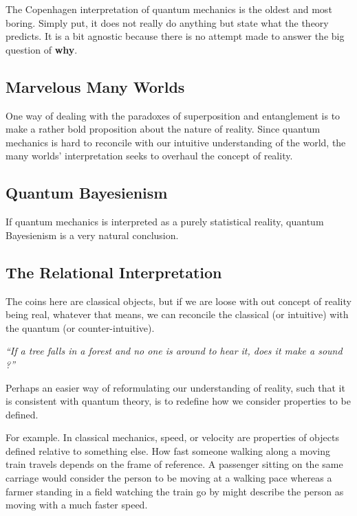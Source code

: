 \documentclass{book}
\begin{document}
The Copenhagen interpretation of quantum mechanics is the oldest and most boring. Simply put, it does not really do anything but state what the theory predicts. It is a bit agnostic because there is no attempt made to answer the big question of \textbf{why}.

\subsection{Marvelous Many Worlds}

One way of dealing with the paradoxes of superposition and entanglement is to make a rather bold proposition about the nature of reality. Since quantum mechanics is hard to reconcile with our intuitive understanding of the world, the many worlds' interpretation seeks to overhaul the concept of reality.



\subsection{Quantum Bayesienism}

If quantum mechanics is interpreted as a purely statistical reality, quantum Bayesienism is a very natural conclusion. 

\subsection{The Relational Interpretation}
The coins here are classical objects, but if we are loose with out concept of reality being real, whatever that means, we can reconcile the classical (or intuitive) with the quantum (or counter-intuitive). 

\textit{``If a tree falls in a forest and no one is around to hear it, does it make a sound ?''}

Perhaps an easier way of reformulating our understanding of reality, such that it is consistent with quantum theory, is to redefine how we consider properties to be defined. \newline

For example. In classical mechanics, speed, or velocity are properties of objects defined relative to something else. How fast someone walking along a moving train travels depends on the frame of reference. A passenger sitting on the same carriage would consider the person to be moving at a walking pace whereas a farmer standing in a field watching the train go by might describe the person as moving with a much faster speed. \newline
\end{document}

